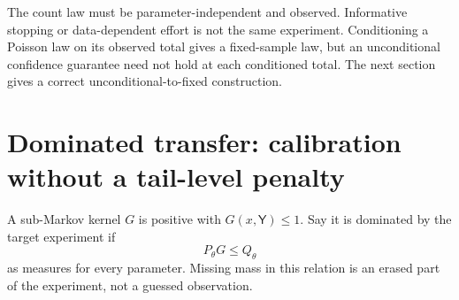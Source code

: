 \documentclass[11pt]{article}
\numberwithin{equation}{section}
\theoremstyle{definition}
\theoremstyle{remark}
\begin{document}
The count law must be parameter-independent and observed. Informative stopping or data-dependent effort is not the same experiment. Conditioning a Poisson law on its observed total gives a fixed-sample law, but an unconditional confidence guarantee need not hold at each conditioned total. The next section gives a correct unconditional-to-fixed construction.

\section{Dominated transfer: calibration without a tail-level penalty}\label{sec:dominated}
A sub-Markov kernel $G$ is positive with $G(x,\mathsf Y)\le1$. Say it is dominated by the target experiment if
\begin{equation}\label{eq:domination}
 P_\theta G\le Q_\theta
\end{equation}
as measures for every parameter. Missing mass in this relation is an erased part of the experiment, not a guessed observation.
\end{document}

